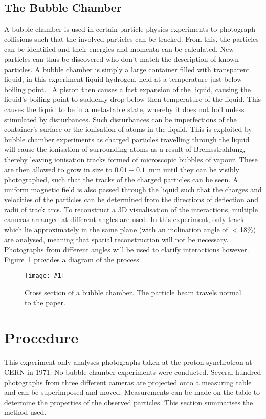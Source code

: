 \documentclass[twocolumn]{article}
\newcommand{\insertFigure}[1]{%
   \texttt{[image: \#1]}%
}
\begin{document}

\subsection{The Bubble Chamber}
A bubble chamber is used in certain particle physics experiments to photograph collisions such that the involved particles can be tracked. From this, the particles can be identified and their energies and momenta can be calculated. New particles can thus be discovered who don't match the description of known particles. A bubble chamber is simply a large container filled with transparent liquid, in this experiment liquid hydrogen, held at a temperature just below boiling point.~\cite{seul} A piston then causes a fast expansion of the liquid, causing the liquid's boiling point to suddenly drop below then temperature of the liquid. This causes the liquid to be in a metastable state, whereby it does not boil unless stimulated by disturbances. Such disturbances can be imperfections of the container's surface or the ionisation of atoms in the liquid. This is exploited by bubble chamber experiments as charged particles travelling through the liquid will cause the ionisation of surrounding atoms as a result of Bremsstrahlung, thereby leaving ionisation tracks formed of microscopic bubbles of vapour. These are then allowed to grow in size to $0.01-0.1$~mm until they can be visibly photographed, such that the tracks of the charged particles can be seen. A uniform magnetic field is also passed through the liquid such that the charges and velocities of the particles can be determined from the directions of deflection and radii of track arcs. To reconstruct a 3D visualisation of the interactions, multiple cameras arranged at different angles are used. In this experiment, only track which lie approximately in the same plane (with an inclination angle of $<$18\%) are analysed, meaning that spatial reconstruction will not be necessary. Photographs from different angles will be used to clarify interactions however. Figure~\ref{fig:bubble} provides a diagram of the process. 
\begin{figure}[!h]
	\centering
	\insertFigure{bubble.png}
	\caption{Cross section of a bubble chamber. The particle beam travels normal to the paper.~\cite{perkins}}
	\label{fig:bubble}
\end{figure}

\section{Procedure} \label{sec:Proc}
This experiment only analyses photographs taken at the proton-synchrotron at CERN in 1971. No bubble chamber experiments were conducted. Several hundred photographs from three different cameras are projected onto a measuring table and can be superimposed and moved. Measurements can be made on the table to determine the properties of the observed particles. This section summarises the method used.
\end{document}
